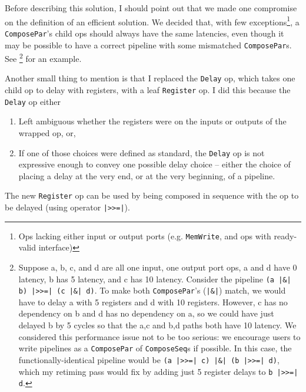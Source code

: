 \documentclass[12pt]{article}
\begin{document}
Before describing this solution, I should point out that we made one
compromise on the definition of an efficient solution. We decided
that, with few exceptions\footnote{Ops lacking either input or output
  ports (e.g. \texttt{MemWrite}, and ops with ready-valid interface)},
a \texttt{ComposePar}'s child ops should always have the same
latencies, even though it may be possible to have a correct pipeline
with some mismatched \texttt{ComposePar}s. See \footnote{Suppose
a, b, c, and d are all one input, one output port ops, a and d have 0
latency, b has 5 latency, and c has 10 latency. Consider the pipeline
\texttt{(a |\&| b) |>>=| (c |\&| d)}. To make both \texttt{ComposePar}'s
(\texttt{|\&|}) match, we would have to delay a with 5 registers
and d with 10 registers. However, c has no dependency on b and d has
no dependency on a, so we could have just delayed b by 5 cycles so
that the a,c and b,d paths both have 10 latency. We considered
this performance issue not to be too serious: we encourage users to
write pipelines as a \texttt{ComposePar} of \texttt{ComposeSeq}s if
possible. In this case, the functionally-identical pipeline would
be \texttt{(a |>>=| c) |\&| (b |>>=| d)}, which my retiming pass would
fix by adding just 5 register delays to \texttt{b |>>=| d}.
} for an example.

Another small thing to mention is that I replaced the \texttt{Delay}
op, which takes one child op to delay with registers, with a leaf
\texttt{Register} op. I did this because the \texttt{Delay} op either
\begin{enumerate}
\item Left ambiguous whether the registers were on the inputs or
  outputs of the wrapped op, or,
\item If one of those choices were defined as standard, the
  \texttt{Delay} op is not expressive enough to convey one
  possible delay choice -- either the choice of placing a delay
  at the very end, or at the very beginning, of a pipeline.
\end{enumerate}
The new \texttt{Register} op can be used by being composed in
sequence with the op to be delayed (using operator \texttt{|>>=|}).
\end{document}
